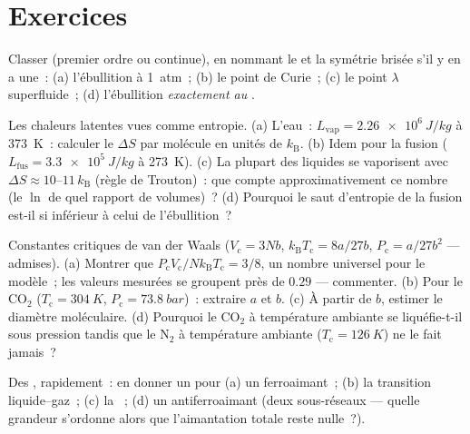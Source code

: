 \section{Exercices}

\begin{exercise}[$\star$]\label{exo:b3:phase-transitions:1}
Classer (premier ordre ou continue), en nommant le 
et la symétrie brisée s'il y en a une~: (a) l'ébullition à
\qty{1}{atm}~; (b) le point de Curie~; (c) le point $\lambda$
superfluide~; (d) l'ébullition \emph{exactement au} .
\end{exercise}

\begin{exercise}[$\star$]\label{exo:b3:phase-transitions:2}
Les chaleurs latentes vues comme entropie. (a) L'eau~: $L_{\text{vap}} =
\qty{2.26e6}{J/kg}$ à \qty{373}{K}~: calculer le $\Delta S$ par
molécule en unités de $k_{\text{B}}$. (b) Idem pour la fusion
($L_{\text{fus}} = \qty{3.3e5}{J/kg}$ à \qty{273}{K}). (c) La
plupart des liquides se vaporisent avec
$\Delta S \approx 10$--$11\,k_{\text{B}}$ (règle de Trouton)~: que
compte approximativement ce nombre (le $\ln$ de quel rapport de
volumes)~? (d) Pourquoi le saut d'entropie de la fusion est-il si
inférieur à celui de l'ébullition~?
\end{exercise}

\begin{exercise}[$\star$]\label{exo:b3:phase-transitions:3}
Constantes critiques de van der Waals ($V_{\text{c}} = 3Nb$,
$k_{\text{B}}T_{\text{c}} = 8a/27b$, $P_{\text{c}} = a/27b^2$ ---
admises). (a) Montrer que $P_{\text{c}}V_{\text{c}}/Nk_{\text{B}}T_{\text{
c}} = 3/8$, un nombre universel pour le modèle~; les valeurs
mesurées se groupent près de $0.29$ --- commenter. (b) Pour le
CO$_2$ ($T_{\text{c}} = \qty{304}{K}$,
$P_{\text{c}} = \qty{73.8}{bar}$)~: extraire $a$ et $b$. (c) À
partir de $b$, estimer le diamètre moléculaire. (d) Pourquoi le
CO$_2$ à température ambiante se liquéfie-t-il sous pression tandis
que le N$_2$ à température ambiante ($T_{\text{c}} =
\qty{126}{K}$) ne le fait jamais~?
\end{exercise}

\begin{exercise}[$\star$]\label{exo:b3:phase-transitions:4}
Des , rapidement~: en donner un pour (a) un
ferroaimant~; (b) la transition liquide--gaz~; (c) la ~; (d) un antiferroaimant (deux sous-réseaux ---
quelle grandeur s'ordonne alors que l'aimantation totale reste
nulle~?).
\end{exercise}

